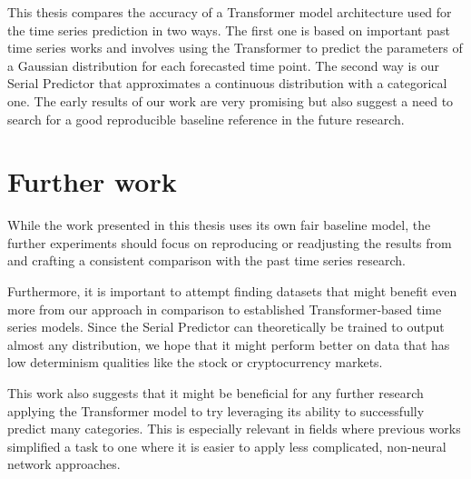 \documentclass[en]{pracamgr}
\begin{document}
This thesis compares the accuracy of a Transformer model architecture used for the time series prediction in two ways. The first one is based on important past time series works and involves using the Transformer to predict the parameters of a Gaussian distribution for each forecasted time point. The second way is our Serial Predictor that approximates a continuous distribution with a categorical one. The early results of our work are very promising but also suggest a need to search for a good reproducible baseline reference in the future research.

\section{Further work}

While the work presented in this thesis uses its own fair baseline model, the further experiments should focus on reproducing or readjusting the results from \cite{enhancing} and crafting a consistent comparison with the past time series research.

Furthermore, it is important to attempt finding datasets that might benefit even more from our approach in comparison to established Transformer-based time series models. Since the Serial Predictor can theoretically be trained to output almost any distribution, we hope that it might perform better on data that has low determinism qualities like the stock or cryptocurrency markets.

This work also suggests that it might be beneficial for any further research applying the Transformer model to try leveraging its ability to successfully predict many categories.
This is especially relevant in fields where previous works simplified a task to one where it is easier to apply less complicated, non-neural network approaches.
\end{document}
